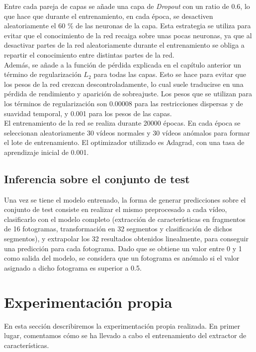 \documentclass[../main.tex]{memoir}
\begin{document}
Entre cada pareja de capas se añade una capa de \textit{Dropout} con
un ratio de 0.6, lo que hace que durante el entrenamiento, en cada
época, se desactiven aleatoriamente el 60 \% de las neuronas de la
capa. Esta estrategia se utiliza para evitar que el conocimiento de la
red recaiga sobre unas pocas neuronas, ya que al desactivar partes de
la red aleatoriamente durante el entrenamiento se obliga a repartir el
conocimiento entre distintas partes de la red.\\

Además, se añade a la función de pérdida explicada en el capítulo
anterior un término de regularización $L_2$ para todas las capas. Esto
se hace para evitar que los pesos de la red crezcan
descontroladamente, lo cual suele traducirse en una pérdida de
rendimiento y aparición de sobreajuste. Los pesos que se utilizan para
los términos de regularización son 0.00008 para las restricciones
dispersas y de suavidad temporal, y 0.001 para los pesos de las capas.\\

El entrenamiento de la red se realiza durante 20000 épocas. En cada
época se seleccionan aleatoriamente 30 vídeos normales y 30 vídeos
anómalos para formar el lote de entrenamiento. El optimizador
utilizado es Adagrad, con una tasa de aprendizaje inicial de 0.001.

\subsection{Inferencia sobre el conjunto de test}

Una vez se tiene el modelo entrenado, la forma de generar predicciones
sobre el conjunto de test consiste en realizar el mismo preprocesado a
cada vídeo, clasificarlo con el modelo completo (extracción de
características en fragmentos de 16 fotogramas, transformación en 32
segmentos y clasificación de dichos segmentos), y extrapolar los 32
resultados obtenidos linealmente, para conseguir una predicción para
cada fotograma. Dado que se obtiene un valor entre 0 y 1 como salida
del modelo, se considera que un fotograma es anómalo si el valor asignado
a dicho fotograma es superior a 0.5.\\

\section{Experimentación propia}

En esta sección describiremos la experimentación propia realizada. En
primer lugar, comentamos cómo se ha llevado a cabo el entrenamiento
del extractor de características.
\end{document}
